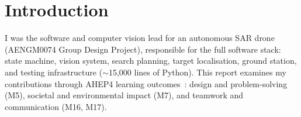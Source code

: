 \section{Introduction}
\label{sec:introduction}

I was the software and computer vision lead for an autonomous SAR drone (AENGM0074 Group Design Project), responsible for the full software stack: state machine, vision system, search planning, target localisation, ground station, and testing infrastructure (${\sim}$15,000 lines of Python). This report examines my contributions through AHEP4 learning outcomes~\cite{ahep4}: design and problem-solving (M5), societal and environmental impact (M7), and teamwork and communication (M16, M17).
